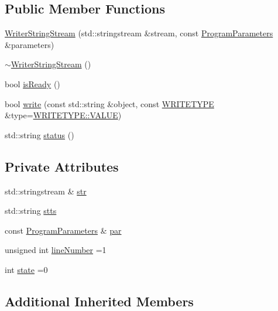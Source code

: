 \subsection*{Public Member Functions}
\begin{DoxyCompactItemize}
\item 
\hyperlink{classWriterStringStream_a96a17e1928eb2f037225eec2f21a1c1b}{Writer\+String\+Stream} (std\+::stringstream \&stream, const \hyperlink{structProgramParameters}{Program\+Parameters} \&parameters)
\item 
\hyperlink{classWriterStringStream_a0b789879c2adc30ad28012bc47b7f82f}{$\sim$\+Writer\+String\+Stream} ()
\item 
bool \hyperlink{classWriterStringStream_aade0855bffddf11f29ed6390b7c088bd}{is\+Ready} ()
\item 
bool \hyperlink{classWriterStringStream_abe031fad8bac6f5379b97a7f9e9ed281}{write} (const std\+::string \&object, const \hyperlink{classWriterInterface_af35706b761b016972144a9333637d93d}{W\+R\+I\+T\+E\+T\+Y\+PE} \&type=\hyperlink{classWriterInterface_af35706b761b016972144a9333637d93daecc2e9c313faddb07e7da223c1dc5c3f}{W\+R\+I\+T\+E\+T\+Y\+P\+E\+::\+V\+A\+L\+UE})
\item 
std\+::string \hyperlink{classWriterStringStream_a2a5fdbd3f4b48f070cc9dd82013df43f}{status} ()
\end{DoxyCompactItemize}
\subsection*{Private Attributes}
\begin{DoxyCompactItemize}
\item 
std\+::stringstream \& \hyperlink{classWriterStringStream_a9be1a39ca3e7936fa6e5ed8883a71f77}{str}
\item 
std\+::string \hyperlink{classWriterStringStream_a7dc8eef2d1616689d994b14d9b68ff89}{stts}
\item 
const \hyperlink{structProgramParameters}{Program\+Parameters} \& \hyperlink{classWriterStringStream_a277f75abd6a10bb97d293a2913cd4534}{par}
\item 
unsigned int \hyperlink{classWriterStringStream_aa633a917974ab987e4cddd44e408dc53}{line\+Number} =1
\item 
int \hyperlink{classWriterStringStream_aba2441895640b9fe440d82c0bc678cdf}{state} =0
\end{DoxyCompactItemize}
\subsection*{Additional Inherited Members}



